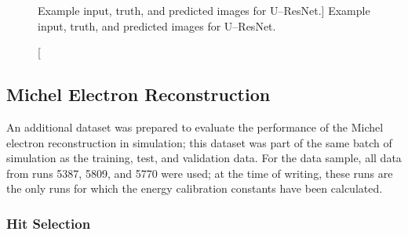 \begin{figure}
	\caption
	[Example input, truth, and predicted images for U--ResNet.]
	{Example input, truth, and predicted images for U--ResNet.}
	\label{fig:unet_example}
\end{figure}

\subsection{Michel Electron Reconstruction}

An additional dataset was prepared to evaluate the performance of the Michel
electron reconstruction in simulation; this dataset was part of the same batch
of simulation as the training, test, and validation data. For the \protodune{} 
data sample, all data from runs 5387, 5809, and 5770 were used; at the time of 
writing, these runs are the only runs for which the energy calibration 
constants have been calculated.

\subsubsection{Hit Selection}

